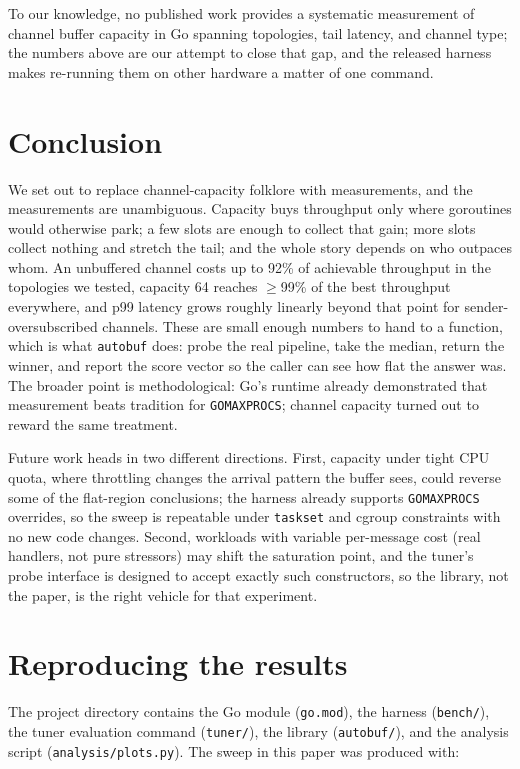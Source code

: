 \documentclass[10pt,a4paper]{article}
\begin{document}
To our knowledge, no published work provides a systematic measurement of
channel buffer capacity in Go spanning topologies, tail latency, and channel
type; the numbers above are our attempt to close that gap, and the released
harness makes re-running them on other hardware a matter of one command.

\section{Conclusion}
\label{sec:conclusion}

We set out to replace channel-capacity folklore with measurements, and the
measurements are unambiguous. Capacity buys throughput only where goroutines
would otherwise park; a few slots are enough to collect that gain; more slots
collect nothing and stretch the tail; and the whole story depends on who
outpaces whom. An unbuffered channel costs up to
92\% of achievable throughput in the topologies we tested, capacity 64
reaches $\geq$99\% of the best throughput everywhere, and p99
latency grows roughly linearly beyond that point for sender-oversubscribed
channels. These are small enough numbers to hand to a function, which is what
\texttt{autobuf} does: probe the real pipeline, take the median, return the
winner, and report the score vector so the caller can see how flat the answer
was. The broader point is methodological: Go's runtime already demonstrated
that measurement beats tradition for \texttt{GOMAXPROCS}; channel capacity
turned out to reward the same treatment.

Future work heads in two different directions. First, capacity under tight CPU
quota, where throttling changes the arrival pattern the buffer sees, could
reverse some of the flat-region conclusions; the harness already supports
\texttt{GOMAXPROCS} overrides, so the sweep is repeatable under
\texttt{taskset} and cgroup constraints with no new code changes. Second,
workloads with variable per-message cost (real handlers, not pure stressors)
may shift
the saturation point, and the tuner's probe interface is designed to accept
exactly such constructors, so the library, not the paper, is the right vehicle
for that experiment.

\appendix
\section{Reproducing the results}
\label{app:repro}

The project directory contains the Go module (\texttt{go.mod}), the harness
(\texttt{bench/}), the tuner evaluation command (\texttt{tuner/}), the library
(\texttt{autobuf/}), and the analysis script (\texttt{analysis/plots.py}).
The sweep in this paper was produced with:
\end{document}
